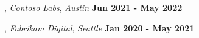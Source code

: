 \documentclass[letter,10pt]{article}
\begin{document}
,
\textit{Contoso Labs}, \textit{Austin} \hfill {\bf Jun 2021 - May 2022}

,
\textit{Fabrikam Digital}, \textit{Seattle} \hfill {\bf Jan 2020 - May 2021}
\end{document}
